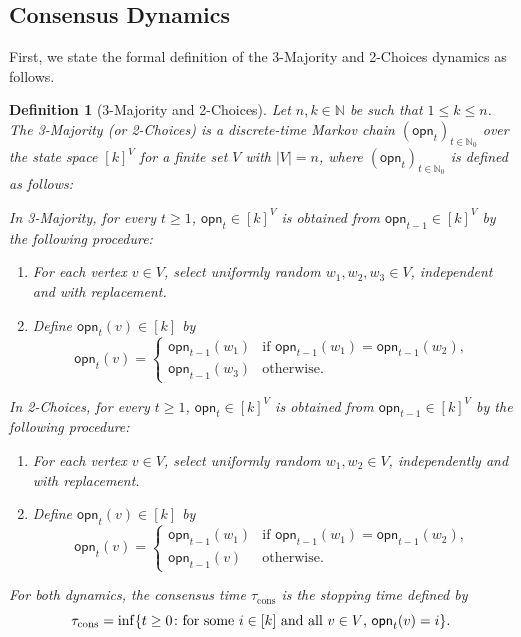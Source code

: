 \documentclass[letterpaper,11pt]{article}
\newtheorem{definition}[theorem]{Definition}
\DeclarePairedDelimiter{\cbra}{\lbrace}{\rbrace} %
\newcommand{\Nat}{\mathbb{N}}
\newcommand{\taucons}{\tau_{\mathrm{cons}}}
\newcommand{\opinion}{\mathsf{opn}}
\begin{document}
\subsection{Consensus Dynamics} \label{sec:consensus dynamics}
First, we state the formal definition of the 3-Majority and 2-Choices dynamics as follows.
\begin{definition}[3-Majority and 2-Choices] \label{def:3-Majority and 2-Choices}
  Let $n,k\in \Nat$ be such that $1\le k\le n$.
  The \emph{3-Majority} (or \emph{2-Choices}) 
  is a discrete-time Markov chain $(\opinion_t)_{t\in\Nat_0}$ over the state space $[k]^V$ for a finite set $V$ with $|V|=n$, where $(\opinion_t)_{t\in\Nat_0}$ is defined as follows:

  In 3-Majority, for every $t\ge 1$, $\opinion_t\in[k]^V$ is obtained from $\opinion_{t-1}\in[k]^V$ by the following procedure:
  \begin{enumerate}
      \item For each vertex $v\in V$, select uniformly random $w_1,w_2,w_3\in V$, independent and with replacement.
      \item Define $\opinion_{t}(v)\in [k]$ by
      \[
          \opinion_t(v) = 
          \begin{cases}
              \opinion_{t-1}(w_1) & \text{if $\opinion_{t-1}(w_1)=\opinion_{t-1}(w_2)$}, \\
              \opinion_{t-1}(w_3) & \text{otherwise}.
          \end{cases}
      \]
  \end{enumerate}
  
  In 2-Choices, for every $t\ge 1$, $\opinion_t\in[k]^V$ is obtained from $\opinion_{t-1}\in[k]^V$ by the following procedure:
    \begin{enumerate}
        \item For each vertex $v\in V$, select uniformly random $w_1,w_2\in V$, independently and with replacement.
        \item Define $\opinion_{t}(v)\in [k]$ by
        \[
            \opinion_t(v) = 
            \begin{cases}
                \opinion_{t-1}(w_1) & \text{if $\opinion_{t-1}(w_1)=\opinion_{t-1}(w_2)$}, \\
                \opinion_{t-1}(v) & \text{otherwise}.
            \end{cases}
        \]
    \end{enumerate}

  For both dynamics, the \emph{consensus time} $\tau_{\mathrm{cons}}$ is the stopping time defined by
  \[
      \taucons = \inf\cbra*{t\geq 0 \colon \text{for some $i\in[k]$ and all $v\in V$, $\opinion_t(v)=i$}}.
  \]
  \end{definition}
\end{document}
